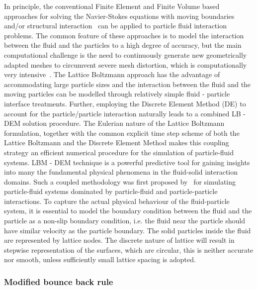In principle, the conventional Finite Element and Finite Volume based 
approaches for solving the Navier-Stokes equations with moving boundaries 
and/or structural interaction~\citep{Bathe2004} can be applied to particle 
fluid interaction problems. The common feature of these approaches is to model 
the interaction between the fluid and the particles to a high degree of 
accuracy, but the main computational challenge is the need to continuously 
generate new geometrically adapted meshes to circumvent severe mesh distortion, 
which is computationally very intensive~\citep{Han2007a}. The Lattice Boltzmann 
approach has the advantage of accommodating large particle sizes and the 
interaction between the fluid and the moving particles can be modelled through 
relatively simple fluid - particle interface treatments. Further, employing the 
Discrete Element Method (DE) to account for the particle/particle interaction 
naturally leads to a combined LB - DEM solution procedure. The Eulerian nature 
of the Lattice Boltzmann formulation, together with the common explicit time 
step scheme of both the Lattice Boltzmann and the Discrete Element Method makes 
this 
coupling strategy an efficient numerical procedure for the simulation of 
particle-fluid systems. LBM - DEM technique is a powerful predictive tool for 
gaining insights into many the fundamental physical phenomena in the 
fluid-solid interaction domains. Such a coupled methodology was first proposed 
by~\citep{Cook2004} for simulating particle-fluid systems dominated by 
particle-fluid and particle-particle interactions. To capture the actual 
physical behaviour of the fluid-particle system, it is essential to model the 
boundary condition between the fluid and the particle as a non-slip boundary 
condition, i.e. the fluid near the particle should have similar velocity as the 
particle boundary. The solid particles inside the fluid are represented by 
lattice nodes. The discrete nature of lattice will result in stepwise 
representation of the surfaces, which are circular, this is neither accurate 
nor smooth, unless sufficiently small lattice spacing is adopted. 


\subsubsection*{Modified bounce back rule}

